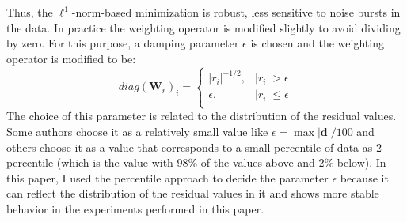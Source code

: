 Thus, the $\ell^1$-norm-based minimization is robust, 
less sensitive to noise bursts in the data. 
In practice the weighting operator is modified slightly to avoid dividing by zero.
For this purpose, a damping parameter $\epsilon$ is chosen and the weighting operator is modified to be:
\[
diag({\mathbf W_r})_i =
\left\{
\begin{array}{cc}
|r_i|^{-1/2}, & |r_i| > \epsilon \\
\epsilon, & |r_i| \le \epsilon  \\
\end{array}
\right.
\]
The choice of this parameter is related to the distribution of the residual values.
Some authors choose it as a relatively small value like $\epsilon = \max|\mathbf d|/100$
and others choose it as a value that corresponds to a small percentile of data as 2 percentile 
(which is the value with 98\% of the values above and 2\% below).
In this paper, I used the percentile approach to decide the parameter $\epsilon$ because 
it can reflect the distribution of the residual values in it 
and shows more stable behavior in the experiments performed in this paper.

